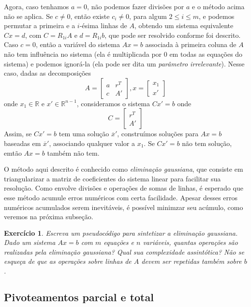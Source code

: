 \documentclass[]{article}
\newtheorem{exercicio}{Exercício}
\numberwithin{equation}{section}
\begin{document}
Agora, caso tenhamos $a = 0$, não podemos fazer divisões por $a$ e o método acima não se aplica. Se $c \neq 0$, então existe $c_i \neq 0$, para algum $2 \leq i \leq m$, e podemos permutar a primeira e a $i$-ésima linhas de $A$, obtendo um sistema equivalente $Cx = d$, com $C = R_{1i}A$ e $d = R_{1i} b$, que pode ser resolvido conforme foi descrito. Caso $c = 0$, então a variável do sistema $Ax = b$ associada à primeira coluna de $A$ não tem influência no sistema (ela é multiplicada por 0 em todas as equações do sistema) e podemos ignorá-la (ela pode ser dita um \emph{parâmetro irrelevante}). Nesse caso, dadas as decomposições
$$
A =
\begin{bmatrix}
a & r^T \\
c & A'
\end{bmatrix}
,
x =
\begin{bmatrix}
x_1 \\
x'
\end{bmatrix}
$$
onde $x_1 \in \mathbb{R}$ e $x' \in \mathbb{R}^{n - 1}$, consideramos o sistema $Cx' = b$ onde
$$
C =
\begin{bmatrix}
r^T \\
A'
\end{bmatrix}
$$
Assim, se $Cx' = b$ tem uma solução $\overline{x}'$, construímos soluções para $Ax = b$ baseadas em $\overline{x}'$, associando qualquer valor a $x_1$. Se $Cx' = b$ não tem solução, emtão $Ax = b$ também não tem.

O método aqui descrito é conhecido como \emph{eliminação gaussiana}, que consiste em triangularizar a matriz de coeficientes do sistema linear para facilitar sua resolução. Como envolve divisões e operações de somas de linhas, é esperado que esse método acumule erros numéricos com certa facilidade. Apesar desses erros numéricos acumulados serem inevitáveis, é possível minimzar seu acúmulo, como veremos na próxima subseção.

\begin{exercicio}
	Escreva um pseudocódigo para sintetizar a eliminação gaussiana. Dado um sistema $Ax = b$ com $m$ equações e $n$ variáveis, quantas operações são realizadas pela eliminação gaussiana? Qual sua complexidade assintótica? Não se esqueça de que as operações sobre linhas de $A$ devem ser repetidas também sobre $b$.
\end{exercicio}

\subsection{Pivoteamentos parcial e total}
\end{document}
